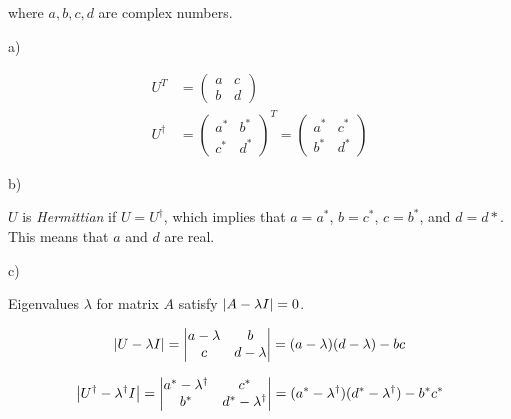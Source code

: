 \documentclass{article}
\begin{document}
where $a, b, c, d$ are complex numbers.

\hspace{1cm}

a)

\hspace{0.5cm}

\begin{align*}
U^T &= \begin{pmatrix} a & c \\ b & d \end{pmatrix} \\
U^{\dagger} &= \begin{pmatrix} a^* & b^* \\ c^* & d^* \end{pmatrix}^T
=\begin{pmatrix} a^* & c^* \\ b^* & d^* \end{pmatrix}
\end{align*}

\vspace{1cm}

b)

\vspace{0.5cm}

$U$ is \emph{Hermittian} if $U=U^{\dagger}$, which implies that $a=a^*$, $b=c^*$, $c=b^*$, and $d=d*$. This means that $a$ and $d$ are real.

\vspace{1cm}

c)

\vspace{0.5cm}

Eigenvalues $\lambda$ for matrix $A$ satisfy $\abs{A-\lambda I}=0$.

\begin{equation*}
\abs{U-\lambda I}=\begin{vmatrix} a-\lambda & b \\ c & d-\lambda \end{vmatrix}
=(a-\lambda)(d-\lambda)-bc
\end{equation*}

\begin{equation*}
\abs{U^{\dagger}-\lambda^{\dagger} I}=\begin{vmatrix} a^*-\lambda^{\dagger} & c^* \\ b^* & d^*-\lambda^{\dagger} \end{vmatrix}
=(a^*-\lambda^{\dagger})(d^*-\lambda^{\dagger})-b^*c^*
\end{equation*}
\end{document}
